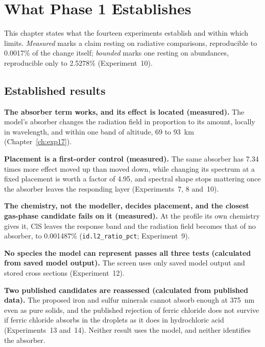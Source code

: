 \chapter{What Phase 1 Establishes}
\label{ch:establish}

This chapter states what the fourteen experiments establish and within which limits.
\emph{Measured} marks a claim resting on radiative comparisons, reproducible to 0.0017\%
of the change itself;
\emph{bounded} marks one resting on abundances, reproducible only to 2.5278\%
(Experiment~10).

\section{Established results}
\label{sec:est-results}

\textbf{The absorber term works, and its effect is located (measured).} The model's
absorber changes the radiation field in proportion to its amount, locally in wavelength,
and within one band of altitude, 69 to 93~km (Chapter~\ref{ch:exp17}).

\textbf{Placement is a first-order control (measured).} The same absorber has 7.34 times
more effect moved up than moved down, while changing its spectrum at a fixed placement is
worth a factor of 4.95, and spectral shape stops mattering once the absorber leaves the
responding layer (Experiments~7, 8 and~10).

\textbf{The chemistry, not the modeller, decides placement, and the closest gas-phase
candidate fails on it (measured).} At the profile its own chemistry gives it, ClS
leaves the response band and the radiation field becomes that of no absorber, to
0.001487\% (\texttt{id.l2\_ratio\_pct}; Experiment~9).

\textbf{No species the model can represent passes all three tests (calculated from
saved model output).} The
screen uses only saved model output and stored cross sections (Experiment~12).

\textbf{Two published candidates are reassessed (calculated from published data).} The
proposed iron and sulfur minerals cannot absorb enough at 375~nm even as pure solids,
and the published rejection of ferric chloride does not survive if ferric chloride absorbs
in the droplets as it does in hydrochloric acid (Experiments~13 and~14). Neither result uses the model, and neither identifies the
absorber.

